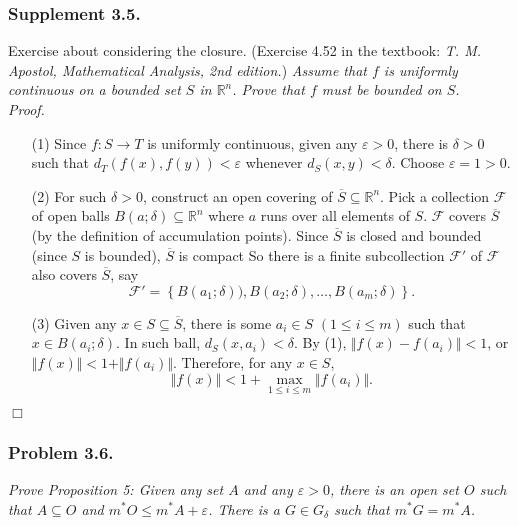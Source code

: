 \documentclass{article}
\begin{document}
\subsubsection*{Supplement 3.5.}
Exercise about considering the closure.
(Exercise 4.52  in the textbook: \emph{T. M. Apostol, Mathematical Analysis, 2nd edition.})
\emph{Assume that $f$ is uniformly continuous on a bounded set $S$ in $\mathbb{R}^n$.
Prove that $f$ must be bounded on $S$.} \\

\emph{Proof.}
\begin{enumerate}
\item[(1)]
  Since $f: S \rightarrow T$ is uniformly continuous,
  given any $\varepsilon > 0$, there is $\delta > 0$ such that
  $d_T(f(x), f(y)) < \varepsilon$ whenever $d_S(x, y) < \delta$.
  Choose $\varepsilon = 1 > 0$.

\item[(2)]
  For such $\delta > 0$, construct an open covering of $\overline{S} \subseteq \mathbb{R}^n$.
  Pick a collection $\mathscr{F}$ of open balls
  $B(a;\delta) \subseteq \mathbb{R}^n$
  where $a$ runs over all elements of $S$.
  $\mathscr{F}$ covers $\overline{S}$ (by the definition of accumulation points).
  Since $\overline{S} $ is closed and bounded (since $S$ is bounded),
  $\overline{S}$ is compact
  So there is a finite subcollection $\mathscr{F}'$ of $\mathscr{F}$
  also covers $\overline{S}$, say
  \[
    \mathscr{F}'
    = \left\{B(a_1;\delta)), B(a_2;\delta), \ldots, B(a_m;\delta) \right\}.
  \]

\item[(3)]
  Given any $x \in S \subseteq \overline{S}$,
  there is some $a_i \in S$ $(1 \leq i \leq m)$ such that $x \in B(a_i;\delta)$.
  In such ball, $d_S(x, a_i) < \delta$.
  By (1), $\Vert f(x) - f(a_i) \Vert < 1$,
  or $\Vert f(x) \Vert < 1 + \Vert f(a_i) \Vert$.
  Therefore, for any $x \in S$,
  \[
    \Vert f(x) \Vert < 1 + \max_{1 \leq i \leq m}{\Vert f(a_i) \Vert}.
  \]
\end{enumerate}
$\Box$ \\






\subsubsection*{Problem 3.6.}
\emph{Prove Proposition 5:
Given any set $A$ and any $\varepsilon > 0$,
there is an open set $O$ such that $A \subseteq O$
and $m^{*}O \leq m^{*}A + \varepsilon$.
There is a $G \in G_{\delta}$ such that $m^{*}G = m^{*}A$.} \\
\end{document}
